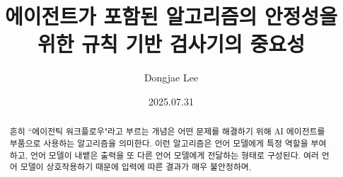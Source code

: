 \documentclass[11pt, oneside]{article}
\title{에이전트가 포함된 알고리즘의 안정성을 위한 규칙 기반 검사기의 중요성}
\author{Dongjae Lee}
\date{2025.07.31}
\begin{document}
\maketitle

\begin{abstract}

	흔히 ``에이전틱 워크플로우"라고 부르는 개념은 어떤 문제를 해결하기 위해 AI 에이전트를 부품으로 사용하는 알고리즘을 의미한다.
	이런 알고리즘은 언어 모델에게 특정 역할을 부여하고, 언어 모델이 내뱉은 출력을 또 다른 언어 모델에게 전달하는 형태로 구성된다.
	여러 언어 모델이 상호작용하기 때문에 입력에 따른 결과가 매우 불안정하며, 
	
\end{abstract}
\end{document}
